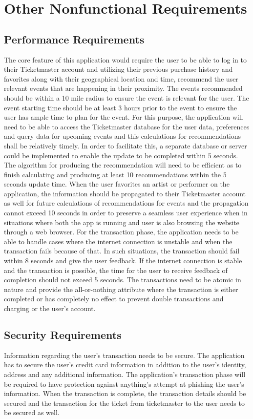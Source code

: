 \section{Other Nonfunctional Requirements}
	\subsection{Performance Requirements}
         The core feature of this application would require the user to be able to log in to their Ticketmaster account and utilizing their previous purchase history and favorites along with their geographical location and time, recommend the user relevant events that are happening in their proximity. The events recommended should be within a 10 mile radius to ensure the event is relevant for the user. The event starting time should be at least 3 hours prior to the event to ensure the user has ample time to plan for the event. For this purpose, the application will need to be able to access the Ticketmaster database for the user data, preferences and query data for upcoming events and this calculations for recommendations shall be relatively timely. In order to facilitate this, a separate database or server could be implemented to enable the update to be completed within 5 seconds. The algorithm for producing the recommendation will need to be efficient as to finish calculating and producing at least 10 recommendations within the 5 seconds update time. When the user favorites an artist or performer on the application, the information should be propagated to their Ticketmaster account as well for future calculations of recommendations for events and the propagation cannot exceed 10 seconds in order to preserve a seamless user experience when in situations where both the app is running and user is also browsing the website through a web browser. For the transaction phase, the application needs to be able to handle cases where the internet connection is unstable and when the transaction fails because of that. In such situations, the transaction should fail within 8 seconds and give the user feedback. If the internet connection is stable and the transaction is possible, the time for the user to receive feedback of completion should not exceed 5 seconds. The transactions need to be atomic in nature and provide the all-or-nothing attribute where the transaction is either completed or has completely no effect to prevent double transactions and charging or the user’s account.
	\subsection{Security Requirements}
         Information regarding the user’s transaction needs to be secure. The application has to secure the user’s credit card information in addition to the user’s identity, address and any additional information. The application’s transaction phase will be required to have protection against anything’s attempt at phishing the user’s information. When the transaction is complete, the transaction details should be secured and the transaction for the ticket from ticketmaster to the user needs to be secured as well. 
